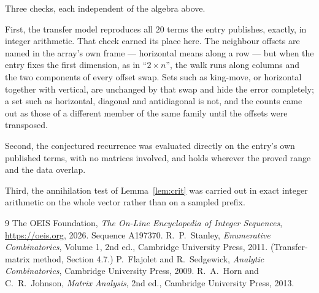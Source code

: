 \documentclass[11pt,a4paper]{article}
\theoremstyle{plain}
\theoremstyle{definition}
\begin{document}
Three checks, each independent of the algebra above.

First, the transfer model reproduces all $20$ terms the entry publishes, exactly, in
integer arithmetic. That check earned its place here. The neighbour offsets are named in the
array's own frame --- horizontal means along a row --- but when the entry fixes the first
dimension, as in ``$2\times n$'', the walk runs along columns and the two components of every
offset swap. Sets such as king-move, or horizontal together with vertical, are unchanged by
that swap and hide the error completely; a set such as horizontal, diagonal and antidiagonal
is not, and the counts came out as those of a different member of the same family until the
offsets were transposed.

Second, the conjectured recurrence was evaluated directly on the entry's own published terms,
with no matrices involved, and holds wherever the proved range and the data overlap.

Third, the annihilation test of Lemma~\ref{lem:crit} was carried out in exact integer
arithmetic on the whole vector rather than on a sampled prefix.

\begin{thebibliography}{9}
 The OEIS Foundation, \emph{The On-Line Encyclopedia of Integer
Sequences}, \url{https://oeis.org}, 2026. Sequence A197370.
 R.~P.~Stanley, \emph{Enumerative Combinatorics}, Volume 1, 2nd ed.,
Cambridge University Press, 2011. (Transfer-matrix method, Section 4.7.)
 P.~Flajolet and R.~Sedgewick, \emph{Analytic Combinatorics}, Cambridge
University Press, 2009.
 R.~A.~Horn and C.~R.~Johnson, \emph{Matrix Analysis}, 2nd ed., Cambridge
University Press, 2013.
\end{thebibliography}
\end{document}
